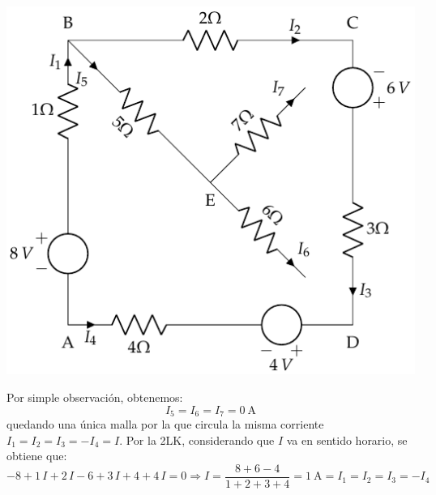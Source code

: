 \begin{center}
  \includegraphics{figuras/BT1_09_sol.pdf}
\end{center}

Por simple observación, obtenemos:
\begin{equation*}
  I_5=I_6=I_7=\qty{0}{\ampere}
\end{equation*}
quedando una única malla por la que circula la misma corriente
$I_1=I_2=I_3=-I_4=I$. Por la 2LK, considerando que $I$ va en sentido
horario, se obtiene que:
\begin{equation*}
  -8+1\, I+2\,I-6+3\,I+4+4\,I=0\Rightarrow {I = \dfrac{8+6-4}{1+2+3+4}=\qty{1}{\ampere}=I_1=I_2=I_3=-I_4}
\end{equation*}

